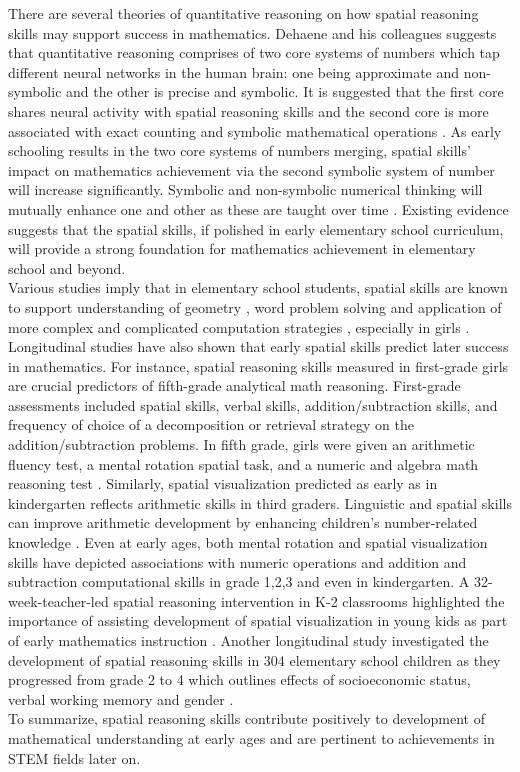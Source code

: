 There are several theories of quantitative reasoning on how spatial reasoning skills may support success in mathematics. Dehaene and his colleagues suggests that quantitative reasoning comprises of two core systems of numbers which tap different neural networks in the human brain: one being approximate and non-symbolic and the other is precise and symbolic. It is suggested that the first core shares neural activity with spatial reasoning skills and the second core is more associated with exact counting and symbolic mathematical operations \parencite{feigenson2004core}. As early schooling results in the two core systems of numbers merging, spatial skills' impact on mathematics achievement via the second symbolic system of number will increase significantly. Symbolic and non-symbolic numerical thinking will mutually enhance one and other as these are taught over time \parencite{piazza2013education}. Existing evidence suggests that the spatial skills, if polished in early elementary school curriculum, will provide a strong foundation for mathematics achievement in elementary school and beyond. \\
Various studies imply that in elementary school students, spatial skills are known to support understanding of geometry \parencite{clements1997development},  word problem solving and application of more complex and complicated computation strategies \parencite{manger1998effects}, especially in girls \parencite{dearing2012young}. Longitudinal studies have also shown that early spatial skills predict later success in mathematics. For instance, spatial reasoning skills measured in first-grade girls are crucial predictors of fifth-grade analytical math reasoning.  First-grade assessments included spatial skills, verbal skills, addition/subtraction skills, and frequency of choice of a decomposition or retrieval strategy on the addition/subtraction problems. In fifth grade, girls were given an arithmetic fluency test, a mental rotation spatial task, and a numeric and algebra math reasoning test \parencite{casey2017girls}. Similarly, spatial visualization predicted as early as in kindergarten reflects arithmetic skills in third graders. Linguistic and spatial skills can improve arithmetic development by enhancing children's number‐related knowledge \parencite{zhang2014linguistic}. Even at early ages, both mental rotation and spatial visualization skills have depicted associations with numeric operations and  addition and subtraction computational skills in grade 1,2,3 and even in kindergarten. A 32-week-teacher-led spatial reasoning intervention in K-2 classrooms highlighted the importance of assisting development of spatial visualization in young kids as part of early mathematics instruction \parencite{Hawes2017}. Another longitudinal study investigated the development of spatial reasoning skills in 304 elementary school children as they progressed from grade 2 to 4 which outlines effects of socioeconomic status, verbal working memory and gender \parencite{carr2018development}. \\
To summarize, spatial reasoning skills contribute positively to development of mathematical understanding at early ages and are pertinent to achievements in STEM fields later on. 

